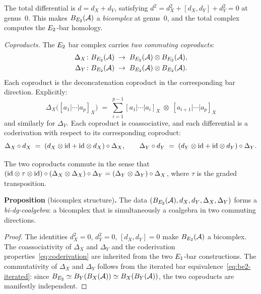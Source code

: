 The total differential is $d = d_X + d_Y$, satisfying $d^2 = d_X^2 +
[d_X, d_Y] + d_Y^2 = 0$ at genus~$0$. This makes $B_{E_2}(\mathcal{A})$ a
\emph{bicomplex} at genus~$0$, and the total complex computes the
$E_2$-bar homology.

\medskip
\noindent\textit{Coproducts.}
The $E_2$ bar complex carries \emph{two commuting coproducts}:
\begin{align}
 \Delta_X &\colon B_{E_2}(\mathcal{A}) \;\to\;
 B_{E_2}(\mathcal{A}) \otimes B_{E_2}(\mathcal{A}), \label{eq:DeltaX}\\
 \Delta_Y &\colon B_{E_2}(\mathcal{A}) \;\to\;
 B_{E_2}(\mathcal{A}) \otimes B_{E_2}(\mathcal{A}). \label{eq:DeltaY}
\end{align}
Each coproduct is the deconcatenation coproduct in the corresponding
bar direction. Explicitly:
\begin{equation}\label{eq:DeltaX-explicit}
 \Delta_X\bigl([a_1 | \cdots | a_p]_X\bigr)
 \;=\;
 \sum_{i=1}^{p-1}
 [a_1 | \cdots | a_i]_X \;\otimes\;
 [a_{i+1} | \cdots | a_p]_X
\end{equation}
and similarly for $\Delta_Y$. Each coproduct is coassociative, and
each differential is a coderivation with respect to its corresponding
coproduct:
\begin{equation}\label{eq:coderivation}
 \Delta_X \circ d_X
 \;=\;
 (d_X \otimes \mathrm{id} + \mathrm{id} \otimes d_X) \circ \Delta_X,
 \qquad
 \Delta_Y \circ d_Y
 \;=\;
 (d_Y \otimes \mathrm{id} + \mathrm{id} \otimes d_Y) \circ \Delta_Y.
\end{equation}

The two coproducts commute in the sense that
$(\mathrm{id} \otimes \tau \otimes \mathrm{id}) \circ
(\Delta_X \otimes \Delta_X) \circ \Delta_Y
= (\Delta_Y \otimes \Delta_Y) \circ \Delta_X$,
where $\tau$ is the graded transposition.

\medskip
\noindent\textbf{Proposition} (bicomplex structure)\textbf{.}\;
The data $(B_{E_2}(\mathcal{A}), d_X, d_Y, \Delta_X, \Delta_Y)$ forms a
\emph{bi-dg-coalgebra}: a bicomplex that is simultaneously a coalgebra
in two commuting directions.

\begin{proof}
The identities $d_X^2 = 0$, $d_Y^2 = 0$, $[d_X, d_Y] = 0$ make
$B_{E_2}(\mathcal{A})$ a bicomplex. The coassociativity of $\Delta_X$ and
$\Delta_Y$ and the coderivation properties~\eqref{eq:coderivation}
are inherited from the two $E_1$-bar constructions. The commutativity
of $\Delta_X$ and $\Delta_Y$ follows from the iterated bar
equivalence~\eqref{eq:be2-iterated}: since $B_{E_2} \simeq
B_Y(B_X(\mathcal{A})) \simeq B_X(B_Y(\mathcal{A}))$, the two coproducts are
manifestly independent.
\end{proof}

